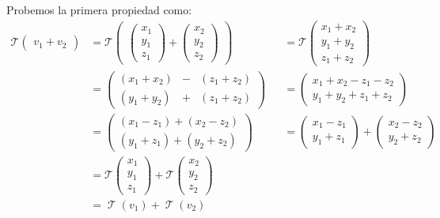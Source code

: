 \documentclass[12pt, fleqn]{report}                             %
\theoremstyle{break}                                            %
\DeclareMathOperator \LinTrans      {\mathcal{T}}               %
\newcommand{\VecLinTrans}[1]{\mathcal{T}\pVector{#1}}           %
\newcommand{\pVector}[1]                                        %
        { \ensuremath{\begin{pmatrix}#1\end{pmatrix}} }             %
\begin{document}
                    Probemos la primera propiedad como:
                    \begin{align*}
                        \VecLinTrans{ v_1 + v_2 }                                             
                            &= \VecLinTrans{ \pVector{x_1\\y_1\\z_1} +\pVector{x_2\\y_2\\z_2} }
                                &&= \VecLinTrans{ x_1+x_2\\y_1+y_2\\z_1+z_2 }                               \\
                            &= \pVector{ (x_1+x_2) & - & (z_1+z_2) \\ (y_1+y_2) & + & (z_1+z_2) }                       
                                &&= \pVector{ x_1+x_2-z_1-z_2 \\ y_1+y_2+z_1+z_2 }                          \\
                            &= \pVector{ (x_1-z_1)+(x_2-z_2) \\ (y_1+z_1)+(y_2+z_2) }                                   
                                &&= \pVector{ x_1-z_1\\y_1+z_1 }  + \pVector{ x_2-z_2\\y_2+z_2 }            \\
                            &= \VecLinTrans{x_1\\y_1\\z_1} +\VecLinTrans{x_2\\y_2\\z_2}                     \\
                            &= \LinTrans(v_1) + \LinTrans(v_2)
                    \end{align*}
\end{document}
